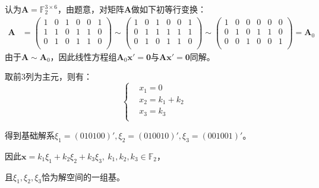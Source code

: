 \begin{Solution}
    认为$\bm{A} = \mathbb{F}_2^{3\times 6}$，由题意，对矩阵$\bm{A}$做如下初等行变换：\\

    $
    \begin{aligned}
        \bm{A} &= \left(
        \begin{matrix}
            1 &0 &1 &0 &0 &1\\
            1 &1 &0 &1 &1 &0\\
            0 &1 &0 &1 &1 &0\\
        \end{matrix}
    \right)
    \sim
    \left(
        \begin{matrix}
            1 &0 &1 &0 &0 &1\\
            0 &1 &1 &1 &1 &1\\
            0 &1 &0 &1 &1 &0\\
        \end{matrix}
    \right)
    \sim
    \left(
        \begin{matrix}
            1 &0 &0 &0 &0 &0\\
            0 &1 &0 &1 &1 &0\\
            0 &0 &1 &0 &0 &1\\
        \end{matrix}
    \right)
    = \bm{A}_0
    \end{aligned}
    $\\

    由于$\bm{A}\sim \bm{A}_0$，因此线性方程组$\bm{A}_0\bm{x}'=\bm{0}$与$\bm{A}\bm{x}'=\bm{0}$同解。

    取前3列为主元，则有：
    \begin{equation}
        \left\{
        \begin{aligned}
            &x_1 = 0\\
            &x_2 = k_1 + k_2\\
            &x_3 = k_3\\
        \end{aligned}
        \right.
    \end{equation}

    得到基础解系$\xi_1=(0 10100)',\xi_2=(010010)',\xi_3=(001001)'$。

    因此$\bm{x} = k_1\xi_1 + k_2\xi_2 + k_3\xi_3,~k_1,k_2,k_3\in \mathbb{F}_2$，
    
    且$\xi_1, \xi_2, \xi_3$恰为解空间的一组基。
\end{Solution}


